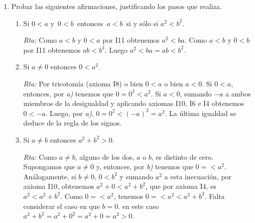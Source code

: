 \documentclass[a4paper,12pt,twoside,spanish,reqno]{amsbook}
\numberwithin{equation}{section}
\newcommand{\rta}{\noindent\textit{Rta: }}
\begin{document}
\begin{enumerate}
\begin{enumerate}
            \rta Como $0<a\,$ y $\,0<b\,$, por axioma I11, $0 \cdot b < a \cdot b$. Por un resultado del teórico  tenemos que $0 \cdot b = 0$, luego $0 < a\cdot b$.
            
            \item $a<b\,$ y $\,c<0$ implican $\,b\cdot c<a\cdot c$
            
            \rta Sumamos $-c$  a la inecuación  $\,c<0$ y  obtenemos, por axioma I10,    $-c + c<-c + 0$, luego por axioma I6 en la parte izquierda y axioma I4 en la parte derecha, obtenemos $0 < -c$: Ahora bien  por axioma I11, $a<b\,$ y  $0 < -c$ implican $a \cdot (-c)<b \cdot (-c)$. Por la regla de los signos tenemos $-a \cdot c<- b \cdot c$. Sumando $a \cdot c$ y $ b \cdot c$  a ambos lados de la inecuación y aplicando axioma I10 y  repetidamente los axiomas I4 e I6, obtenemos  $\,b\cdot c<a\cdot c$.
        \end{enumerate}
        \medskip
        
        \item  Probar las siguientes afirmaciones, justificando los pasos que realiza.
        \begin{enumerate}
            \item Si $0 < a$  y $\,0<b\,$ entonces $\,a<b\,$ si y sólo si $a^2<b^2$.
            
            \rta  Como $a < b$ y $0 < a$ por I11 obtenemos $a^2 < ba$. Como $a < b$ y $0 < b$ por I11 obtenemos $ab < b^2$. Luego  $a^2 < ba = ab < b^2$.
            
            
            \item Si $a\neq 0$  entonces $0 < a^2$.
            
            \rta  Por tricotomía (axioma I8) o bien $0 <a$ o bien $a <0$. Si $0<a$, entonces, por \textit{a)} tenemos que $0 = 0^2 < a^2$.  Si $a<0$, sumando $-a$ a ambos miembros de la desigualdad y aplicando axiomas I10, I6 e I4 obtenemos $0 < -a$. Luego, por \textit{a)},  $0 = 0^2 < (-a)^2 = a^2$. La última igualdad se deduce de la regla de los signos. 
            
            \item Si $a\neq b$  entonces $a^2+b^2>0$.
            
            \rta Como $a\neq b$,  alguno de los dos, $a$ o $b$, es distinto de cero. Supongamos que $a \ne 0$ y, entonces, por  \textit{b)} tenemos que $0 = < a^2$. Análogamente, si $b \ne 0$, $0 < b^2$ y sumando  $a^2$  a esta inecuación, por axioma I10, obtenemos $a^2 + 0 <a^2 + b^2$, que por axioma I4, es $a^2  <a^2 + b^2$. Como $0 = < a^2$, tenemos $0 = < a^2 < a^2 + b^2$. Falta considerar el caso en que  $b =0$. en este caso $a^2 + b^2 = a^2 + 0^2 = a^2 + 0 = a^2 > 0$.
            

\end{enumerate}
\end{enumerate}
\end{document}
